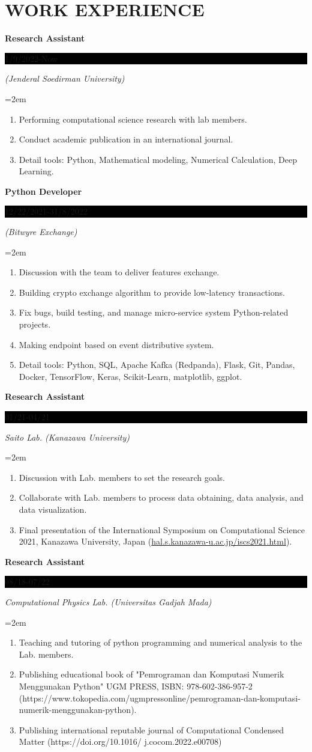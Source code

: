 \documentclass[paper=a4,fontsize=10pt]{scrartcl} %
\newcommand{\sepspace}{\vspace*{1em}}		%
\newcommand{\NewPart}[1]{\section*{\uppercase{#1}}}
\newcommand{\EducationEntry}[4]{
		\noindent \textbf{#1} \hfill      %
		\colorbox{Black}{%
			\parbox{6em}{%
			\hfill\color{White}#2}} \par  %
		\noindent \textit{#3} \par        %
		\noindent\hangindent=2em\hangafter=0 \small #4 %
		\normalsize \par}
\begin{document}
\NewPart{Work experience}{}

\EducationEntry{Research Assistant}{1/9/2022-Now}{(Jenderal Soedirman University)}{
	\begin{enumerate}
		\item Performing computational science research with lab members.
		\item Conduct academic publication in an international journal.
		\item Detail tools: Python, Mathematical modeling, Numerical Calculation, Deep Learning.
	\end{enumerate}
}


\EducationEntry{Python Developer}{12/22/2021-31/8/2022}{(Bitwyre Exchange)}{
	\begin{enumerate}
		\item Discussion with the team to deliver features exchange.
		\item Building crypto exchange algorithm to provide low-latency transactions.
		\item Fix bugs, build testing, and manage micro-service system Python-related projects.
		\item Making endpoint based on event distributive system.
		\item Detail tools: Python, SQL, Apache Kafka (Redpanda), Flask, Git, Pandas, Docker, TensorFlow, Keras, Scikit-Learn, matplotlib, ggplot.	
	\end{enumerate}
}

\sepspace

\EducationEntry{Research Assistant}{01/21-04/21}{Saito Lab. (Kanazawa University)}{
	\begin{enumerate}
		\item Discussion with Lab. members to set the research goals.
		\item Collaborate with Lab. members to process data obtaining, data analysis, and data visualization.
		\item Final presentation of the International Symposium on Computational Science 2021, Kanazawa University, Japan (\url{hal.s.kanazawa-u.ac.jp/iscs2021.html}).
	\end{enumerate}
}

\sepspace

\EducationEntry{Research Assistant}{08/18-07/22}{Computational Physics Lab. (Universitas Gadjah Mada)}{
		\begin{enumerate}
		\item Teaching and tutoring of python programming and numerical analysis to the Lab. members. 
		\item Publishing educational book of "Pemrograman dan Komputasi Numerik Menggunakan Python" UGM PRESS, ISBN: 978-602-386-957-2 (https://www.tokopedia.com/ugmpressonline/pemrograman-dan-komputasi-numerik-menggunakan-python). 
		\item Publishing international reputable journal of Computational Condensed Matter 
		(https://doi.org/10.1016/ j.cocom.2022.e00708)
	\end{enumerate}
}
\end{document}

